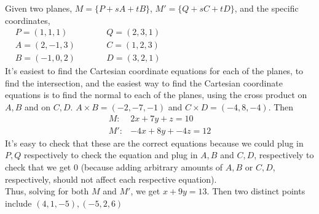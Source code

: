 \documentclass[twoside]{amsart}
\theoremstyle{plain}
\theoremstyle{definition}
\newcommand{\exercisehead}[1]
  {\smallskip
   \noindent{\small\bf Exercise #1.}}
\begin{document}
\exercisehead{8} Given two planes, $M = \{ P + sA + tB \}$, $M' = \{ Q + sC + tD \}$, and the specific coordinates, \\
$\begin{aligned}
  & P = (1,1,1) \\
  & A = (2,-1,3) \\
  & B = (-1,0,2)
\end{aligned} \quad \quad 
\begin{aligned}
  & Q = (2,3,1) \\
  & C = (1,2,3) \\
  & D = (3,2,1) 
\end{aligned}$ \\
It's easiest to find the Cartesian coordinate equations for each of the planes, to find the intersection, and the easiest way to find the Cartesian coordinate equations is to find the normal to each of the planes, using the cross product on $A,B$ and on $C,D$.  $A\times B = (-2,-7,-1)$ and $C\times D = (-4,8,-4)$.  Then 
\[
\begin{aligned}
   M:  & 2x + 7y + z = 10 \\
   M': & -4x + 8y + -4z = 12
\end{aligned}
\]
It's easy to check that these are the correct equations because we could plug in $P,Q$ respectively to check the equation and plug in $A,B$ and $C,D$, respectively to check that we get $0$ (because adding arbitrary amounts of $A,B$ or $C,D$, respectively, should not affect each respective equation).  \\

Thus, solving for both $M$ and $M'$, we get $x+9y=13$.  Then two distinct points include $\boxed{ (4,1,-5), (-5,2,6)}$
\end{document}
